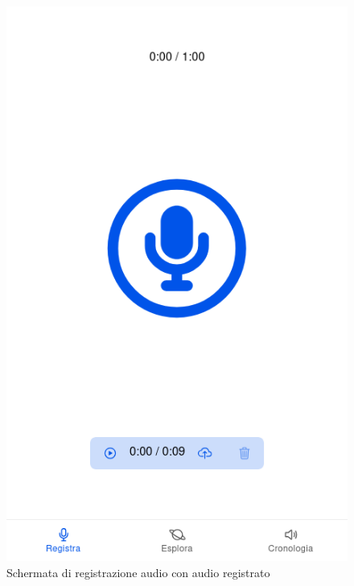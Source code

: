 \documentclass{article}
\begin{document}
\begin{figure}[H]
\begin{minipage}{0.30\textwidth}
        \includegraphics[width=\linewidth]{recorded-audio.png}
        \centering
        \caption{Schermata di registrazione audio con audio registrato}
        \label{fig:recorded-audio}
    \end{minipage} \hfill
    \begin{minipage}{0.30\textwidth}

\end{minipage}
\end{figure}
\end{document}
